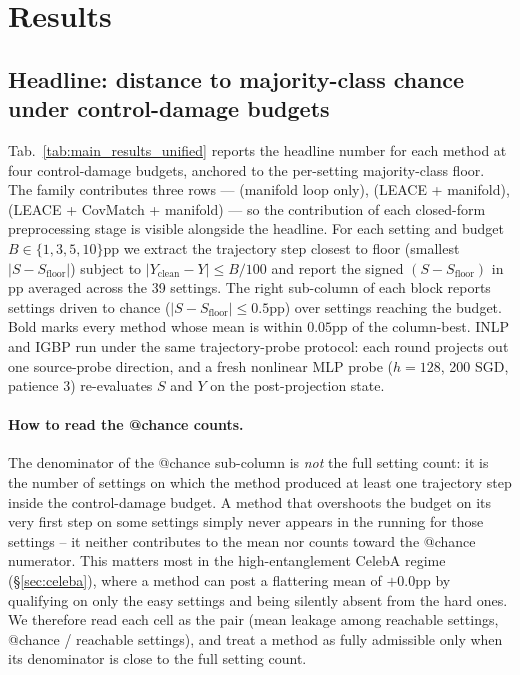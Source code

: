 \section{Results}
\label{sec:results}

\subsection{Headline: distance to majority-class chance under control-damage budgets}
\label{sec:multi_model}

Tab.~\ref{tab:main_results_unified} reports the headline number for each method at four control-damage budgets, anchored to the per-setting majority-class floor. The \TanGCE{} family contributes three rows --- \TanGCE{} (manifold loop only), \TanGCEp{} (LEACE + manifold), \TanGCEpp{} (LEACE + CovMatch + manifold) --- so the contribution of each closed-form preprocessing stage is visible alongside the headline. For each setting and budget $B \in \{1,3,5,10\}$pp we extract the trajectory step closest to floor (smallest $|S - S_{\text{floor}}|$) subject to $|Y_{\text{clean}} - Y| \le B/100$ and report the signed $(S - S_{\text{floor}})$ in pp averaged across the 39 settings. The right sub-column of each block reports settings driven to chance ($|S{-}S_{\text{floor}}| \le 0.5$pp) over settings reaching the budget. Bold marks every method whose mean is within $0.05$pp of the column-best. INLP and IGBP run under the same trajectory-probe protocol: each round projects out one source-probe direction, and a fresh nonlinear MLP probe ($h{=}128$, 200 SGD, patience 3) re-evaluates $S$ and $Y$ on the post-projection state.

\paragraph{How to read the @chance counts.} The denominator of the @chance sub-column is \emph{not} the full setting count: it is the number of settings on which the method produced at least one trajectory step inside the control-damage budget. A method that overshoots the budget on its very first step on some settings simply never appears in the running for those settings -- it neither contributes to the mean nor counts toward the @chance numerator. This matters most in the high-entanglement CelebA regime (§\ref{sec:celeba}), where a method can post a flattering mean of $+0.0$pp by qualifying on only the easy settings and being silently absent from the hard ones. We therefore read each cell as the pair (mean leakage among reachable settings, @chance / reachable settings), and treat a method as fully admissible only when its denominator is close to the full setting count.

